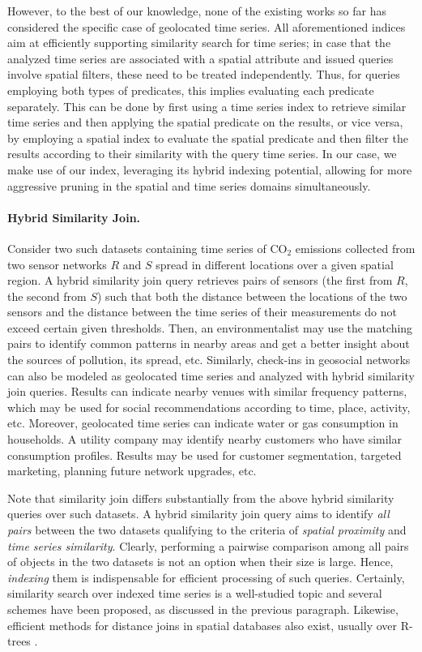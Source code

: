 However, to the best of our knowledge, none of the existing works so far has considered the specific case of geolocated time series. All aforementioned indices aim at efficiently supporting similarity search for time series; in case that the analyzed time series are associated with a spatial attribute and issued queries involve spatial filters, these need to be treated independently. Thus, for queries employing both types of predicates, this implies evaluating each predicate separately. This can be done by first using a time series index to retrieve similar time series and then applying the spatial predicate on the results, or vice versa, by employing a spatial index to evaluate the spatial predicate and then filter the results according to their similarity with the query time series. In our case, we make use of our \btsr index, leveraging its hybrid indexing potential, allowing for more aggressive pruning in the spatial and time series domains simultaneously.

\paragraph{Hybrid Similarity Join.} Consider two such datasets containing time series of CO$_2$ emissions collected from two sensor networks $R$ and $S$ spread in different locations over a given spatial region. A hybrid similarity join query retrieves pairs of sensors (the first from $R$, the second from $S$) such that both the distance between the locations of the two sensors and the distance between the time series of their measurements do not exceed certain given thresholds. Then, an environmentalist may use the matching pairs to identify common patterns in nearby areas and get a better insight about the sources of pollution, its spread, etc. Similarly, check-ins in geosocial networks can also be modeled as geolocated time series and analyzed with hybrid similarity join queries. Results can indicate nearby venues with similar frequency patterns, which may be used for social recommendations according to time, place, activity, etc. Moreover, geolocated time series can indicate water or gas consumption in households. A utility company may identify nearby customers who have similar consumption profiles. Results may be used for customer segmentation, targeted marketing, planning future network upgrades, etc.

Note that similarity join differs substantially from the above hybrid similarity queries over such datasets. A hybrid similarity join query aims to identify {\em all pairs} between the two datasets qualifying to the criteria of {\em spatial proximity} and {\em time series similarity}. Clearly, performing a pairwise comparison among all pairs of objects in the two datasets is not an option when their size is large. Hence, {\em indexing} them is indispensable for efficient processing of such queries. Certainly, similarity search over indexed time series is a well-studied topic and several schemes have been proposed, as discussed in the previous paragraph. Likewise, efficient methods for distance joins in spatial databases also exist, usually over R-trees \cite{DBLP:conf/sigmod/BrinkhoffKS93, papadias1999processing}.

